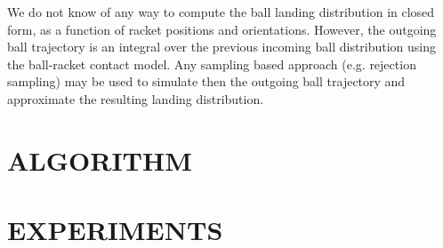 \documentclass[letterpaper, 10 pt, conference]{ieeeconf}
\begin{document}
% 

%
%
%

We do not know of any way to compute the ball landing distribution in closed form, as a function of racket positions and orientations. However, the outgoing ball trajectory is an integral over the previous incoming ball distribution using the ball-racket contact model. Any sampling based approach (e.g. rejection sampling) may be used to simulate then the outgoing ball trajectory and approximate the resulting landing distribution. 


\section{ALGORITHM}\label{alg}

\section{EXPERIMENTS}\label{results}

\end{document}
